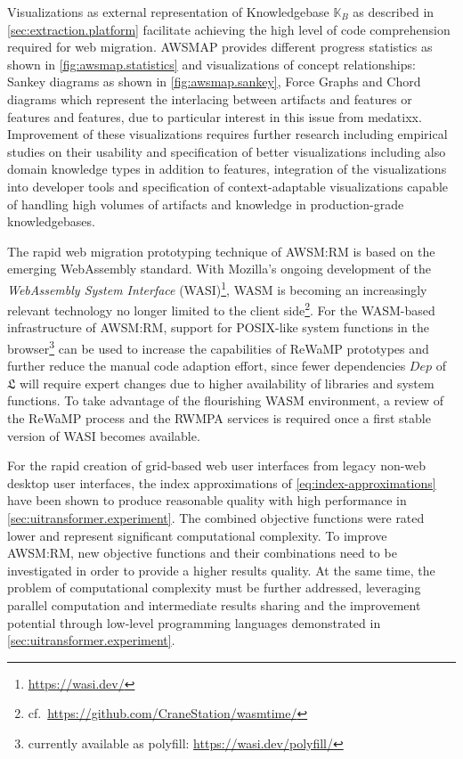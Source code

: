 Visualizations as external representation of Knowledgebase \(\mathbb{K}_{B}\) as described in \cref{sec:extraction.platform} facilitate achieving the high level of code comprehension required for web migration.
AWSMAP provides different progress statistics as shown in \cref{fig:awsmap.statistics} and visualizations of concept relationships: Sankey diagrams as shown in \cref{fig:awsmap.sankey}, Force Graphs and Chord diagrams which represent the interlacing between artifacts and features or features and features, due to particular interest in this issue from medatixx.
Improvement of these visualizations requires further research including empirical studies on their usability and specification of better visualizations including also domain knowledge types in addition to features, integration of the visualizations into developer tools and specification of context-adaptable visualizations capable of handling high volumes of artifacts and knowledge in production-grade knowledgebases.

The rapid web migration prototyping technique of AWSM:RM is based on the emerging WebAssembly standard.
With Mozilla's ongoing development of the \emph{WebAssembly System Interface} (WASI)\footnote{\url{https://wasi.dev/}}, WASM is becoming an increasingly relevant technology no longer limited to the client side\footnote{cf.~\url{https://github.com/CraneStation/wasmtime/}}.
For the WASM-based infrastructure of AWSM:RM, support for POSIX-like system functions in the browser\footnote{currently available as polyfill: \url{https://wasi.dev/polyfill/}} can be used to increase the capabilities of ReWaMP prototypes and further reduce the manual code adaption effort, since fewer dependencies \(Dep\) of \(\mathfrak{L}\) will require expert changes due to higher availability of libraries and system functions.
To take advantage of the flourishing WASM environment, a review of the ReWaMP process and the RWMPA services is required once a first stable version of WASI becomes available.

For the rapid creation of grid-based web user interfaces from legacy non-web desktop user interfaces, the index approximations of \cref{eq:index-approximations} have been shown to produce reasonable quality with high performance in \cref{sec:uitransformer.experiment}.
The combined objective functions were rated lower and represent significant computational complexity.
To improve AWSM:RM, new objective functions and their combinations need to be investigated in order to provide a higher results quality.
At the same time, the problem of computational complexity must be further addressed, leveraging parallel computation and intermediate results sharing and the improvement potential through low-level programming languages demonstrated in \cref{sec:uitransformer.experiment}.

